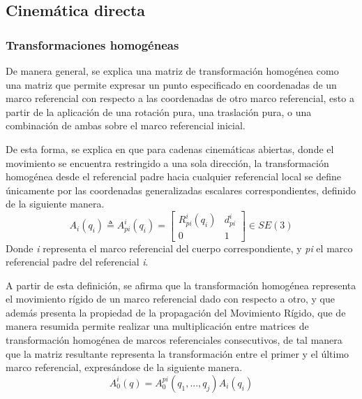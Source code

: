 \subsection{Cinemática directa}
    \subsubsection{Transformaciones homogéneas}
        \noindent De manera general, se explica una matriz de transformación homogénea como una
        matriz que permite expresar un punto especificado en coordenadas de
        un marco referencial con respecto a las coordenadas de otro marco 
        referencial, esto a partir de la aplicación de una rotación pura, 
        una traslación pura, o una combinación de ambas sobre el marco referencial
        inicial.

        De esta forma, se explica en \cite{3DMotion} que para cadenas cinemáticas abiertas, 
        donde el movimiento se encuentra restringido a una sola dirección, la 
        transformación homogénea desde el referencial padre hacia cualquier referencial 
        local se define únicamente por las coordenadas generalizadas escalares 
        correspondientes, definido de la siguiente manera.
        \begin{equation*} 
            A_i(q_i) \triangleq A^i_{pi}(q_i) =
            \begin{bmatrix}
                R^i_{pi}(q_i) & d^i_{pi}\\
                0 & 1
            \end{bmatrix}
            \in SE(3)
        \end{equation*}
        Donde \emph{i} representa el marco referencial del cuerpo
        correspondiente, y \emph{pi} el marco referencial padre del 
        referencial \emph{i}.

        A partir de esta definición, se afirma que la transformación homogénea representa
        el movimiento rígido de un marco referencial dado con respecto a otro, y que además 
        presenta la propiedad de la propagación del Movimiento Rígido, que de manera resumida 
        permite realizar una multiplicación entre matrices de transformación homogénea de 
        marcos referenciales consecutivos, de tal manera que la matriz resultante representa 
        la transformación entre el primer y el último marco referencial, expresándose de la 
        siguiente manera.
        \begin{equation}
            A^i_0(q) =  A^{pi}_0(q_1,...,q_j)A_i(q_i)
            \label{eq:CD}
        \end{equation}

